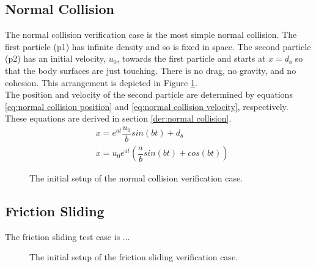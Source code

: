 \documentclass[10pt,a4paper,titlepage]{report}
\begin{document}
\subsection{Normal Collision}
\label{sec:normal collision verification}
The normal collision verification case is the most simple normal collision. The first particle (p1) has infinite density and so is fixed in space. The second particle (p2) has an initial velocity, $u_0$, towards the first particle and starts at $x = d_b$ so that the body surfaces are just touching. There is no drag, no gravity, and no cohesion. This arrangement is depicted in Figure \ref{fig:normal collision}.
\\The position and velocity of the second particle are determined by equations \ref{eq:normal collision position} and \ref{eq:normal collision velocity}, respectively. These equations are derived in section \ref{der:normal collision}.
\begin{align}
&x = e^{at} \dfrac{u_0}{b} sin(bt) + d_b \label{eq:normal collision position} \\
&\dot{x} = u_0 e^{at} (\dfrac{a}{b} sin(bt) + cos(bt)) \label{eq:normal collision velocity}
\end{align}
\begin{figure}[!ht]
\centering

\caption{The initial setup of the normal collision verification case.}
\label{fig:normal collision}
\end{figure}
\subsection{Friction Sliding}
The friction sliding test case is ...
\begin{figure}[!ht]
\centering

\caption{The initial setup of the friction sliding verification case.}
\label{fig:friction sliding}
\end{figure}
\end{document}

